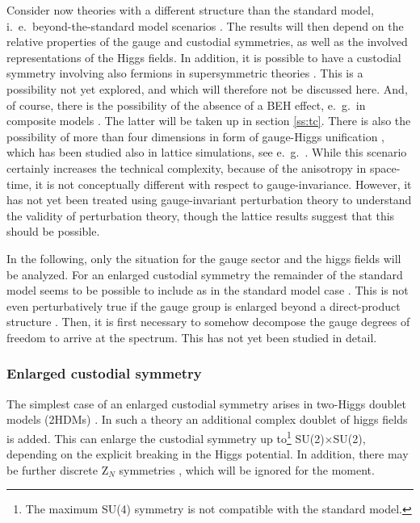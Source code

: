 \documentclass[final,12pt]{article}
\newcommand*{\1}{1\!\!\!\bot}
\begin{document}
Consider now theories with a different structure than the standard model, i.\ e.\ beyond-the-standard model scenarios \cite{Maas:2015gma}. The results will then depend on the relative properties of the gauge and custodial symmetries, as well as the involved representations of the Higgs fields. In addition, it is possible to have a custodial symmetry involving also fermions in supersymmetric theories \cite{Morrissey:2009tf,Aitchison:2007fn}. This is a possibility not yet explored, and which will therefore not be discussed here. And, of course, there is the possibility of the absence of a BEH effect, e.\ g.\ in composite models \cite{Hill:2002ap,Andersen:2011yj,Sannino:2009za,Sannino:2008ha,Morrissey:2009tf,DeGrand:2015zxa}. The latter will be taken up in section \ref{ss:tc}. There is also the possibility of more than four dimensions in form of gauge-Higgs unification \cite{Morrissey:2009tf}, which has been studied also in lattice simulations, see e.\ g.\ \cite{Lang:1986kq,Knechtli:2016pph,Alberti:2015pha,Irges:2013rya,Irges:2012mp}. While this scenario certainly increases the technical complexity, because of the anisotropy in space-time, it is not conceptually different with respect to gauge-invariance. However, it has not yet been treated using gauge-invariant perturbation theory to understand the validity of perturbation theory, though the lattice results suggest \cite{Alberti:2015pha,Knechtli:2016pph} that this should be possible.

In the following, only the situation for the gauge sector and the higgs fields will be analyzed. For an enlarged custodial symmetry the remainder of the standard model seems to be possible to include as in the standard model case \cite{Maas:2016qpu}. This is not even perturbatively true if the gauge group is enlarged beyond a direct-product structure \cite{Bohm:2001yx,Langacker:1980js}. Then, it is first necessary to somehow decompose the gauge degrees of freedom to arrive at the spectrum. This has not yet been studied in detail.

\subsubsection{Enlarged custodial symmetry}\label{sss:nhdm}

The simplest case of an enlarged custodial symmetry arises in two-Higgs doublet models (2HDMs) \cite{Morrissey:2009tf,Branco:2011iw,Ivanov:2017dad}. In such a theory an additional complex doublet of higgs fields is added. This can enlarge the custodial symmetry up to\footnote{The maximum SU(4) symmetry is not compatible with the standard model.} SU(2)$\times$SU(2), depending on the explicit breaking in the Higgs potential. In addition, there may be further discrete Z$_N$ symmetries \cite{Branco:2011iw}, which will be ignored for the moment.
\end{document}

